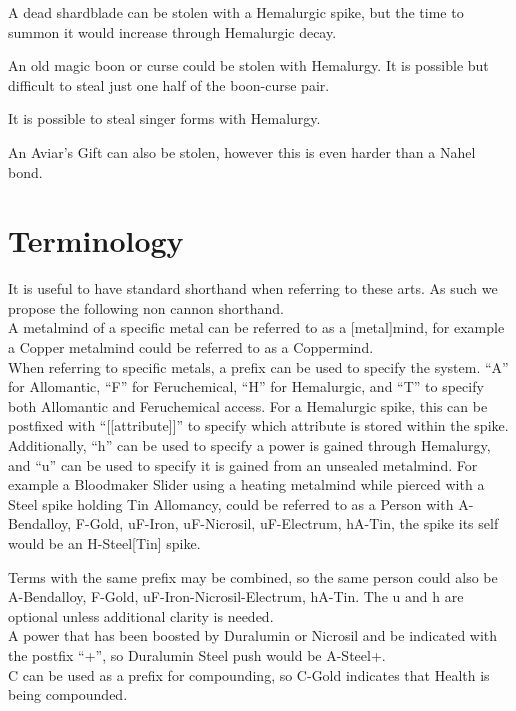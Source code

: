 \documentclass[conference]{IEEEtran}
\begin{document}
A dead shardblade can be stolen with a Hemalurgic spike,\cite{HE-blade} but the time to summon it would increase through Hemalurgic decay.\cite{HE-blade}

An old magic boon or curse could be stolen with Hemalurgy.  It is possible but difficult to steal just one half of the boon-curse pair.\cite{HE-Old}

It is possible to steal singer forms with Hemalurgy. \cite{HE-singer}

An Aviar's Gift can also be stolen, however this is even harder than a Nahel bond.\cite{HE-Aviar} 
\newpage
\section{\textbf{Terminology}}
It is useful to have standard shorthand when referring to these arts.  As such we propose the following non cannon shorthand.\\

A metalmind of a specific metal can be referred to as a [metal]mind, for example a Copper metalmind could be referred to as a Coppermind.\\

When referring to specific metals, a prefix can be used to specify the system.  ``A'' for Allomantic, ``F'' for Feruchemical, ``H'' for Hemalurgic, and ``T'' to specify both Allomantic and Feruchemical access.  For a Hemalurgic spike, this can be postfixed with ``[[attribute]]'' to specify which attribute is stored within the spike.  Additionally, ``h'' can be used to specify a power is gained through Hemalurgy, and ``u'' can be used to specify it is gained from an unsealed metalmind.  For example a Bloodmaker Slider using a heating metalmind while pierced with a Steel spike holding Tin Allomancy, could be referred to as a Person with A-Bendalloy, F-Gold, uF-Iron, uF-Nicrosil, uF-Electrum, hA-Tin, the spike its self would be an H-Steel[Tin] spike.  

Terms with the same prefix may be combined, so the same person could also be A-Bendalloy, F-Gold, uF-Iron-Nicrosil-Electrum, hA-Tin.  
The u and h are optional unless additional clarity is needed.\\

A power that has been boosted by Duralumin or Nicrosil and be indicated with the postfix ``+'', so Duralumin Steel push would be A-Steel+. \\

C can be used as a prefix for compounding, so C-Gold indicates that Health is being compounded.\\
\end{document}
